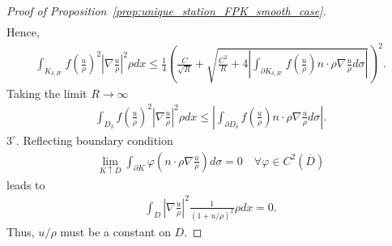 \documentclass[11pt]{article}
\numberwithin{equation}{section}
\theoremstyle{definition}
\begin{document}
\begin{proof}[Proof of Proposition~\ref{prop:unique_station_FPK_smooth_case}]
\begin{align*}
\end{align*}
Hence,
\begin{align*}
    \int_{K_{\delta, R'}} f\left(\frac{u}{\rho}\right)^{2}\left|\nabla\frac{u}{\rho}\right|^{2}\rho dx
    \le \frac{1}{4}\left(\frac{C}{\sqrt{R}}+ 
    \sqrt{\frac{C^2}{R}+ 4  \left|\int_{\partial K_{\delta, R'}}f\left(\frac{u}{\rho}\right)n\cdot\rho\nabla\frac{u}{\rho}  d\sigma \right| }\right)^{2}.
\end{align*}
Taking the limit $R\to\infty$
\begin{align*}
    \int_{ D_{\delta}}f\left(\frac{u}{\rho}\right)^{2}\left|\nabla\frac{u}{\rho}\right|^{2}\rho dx
    \le \left|\int_{\partial D_{\delta}}f\left(\frac{u}{\rho}\right)n\cdot\rho\nabla\frac{u}{\rho}d\sigma\right|.
\end{align*}
$3^{\circ}.$ Reflecting boundary condition 
\begin{align*}
    \lim\limits_{K\uparrow D}\int_{\partial K}\varphi \left(n\cdot\rho\nabla\frac{u}{\rho}\right)d\sigma 
    =0 \quad\forall \varphi\in C^{2}(\overline{D})
\end{align*}
leads to 
\begin{align*}
    \int_{ D}\left|\nabla\frac{u}{\rho}\right|^{2}\frac{1}{(1+u/\rho)^2}\rho dx
    = 0.
\end{align*}
Thus, $u/\rho$ must be a constant on $D$.
\end{proof}

\printbibliography
\end{document}
